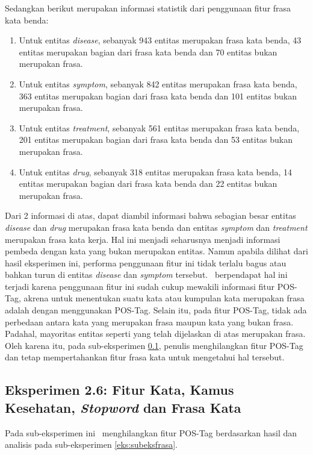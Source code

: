	Sedangkan berikut merupakan informasi statistik dari penggunaan fitur frasa kata benda:
	\begin{enumerate}
		\item Untuk entitas \textit{disease}, sebanyak 943 entitas merupakan frasa kata benda, 43 entitas merupakan bagian dari frasa kata benda dan 70 entitas bukan merupakan frasa.
		\item Untuk entitas \textit{symptom}, sebanyak 842 entitas merupakan frasa kata benda, 363 entitas merupakan bagian dari frasa kata benda dan 101 entitas bukan merupakan frasa.
		\item Untuk entitas \textit{treatment}, sebanyak 561 entitas merupakan frasa kata benda, 201 entitas merupakan bagian dari frasa kata benda dan 53 entitas bukan merupakan frasa.
		\item Untuk entitas \textit{drug}, sebanyak 318 entitas merupakan frasa kata benda, 14 entitas merupakan bagian dari frasa kata benda dan 22  entitas bukan merupakan frasa.
	\end{enumerate}
	
	Dari 2 informasi di atas, dapat diambil informasi bahwa sebagian besar entitas \textit{disease} dan \textit{drug} merupakan frasa kata benda dan entitas \textit{symptom} dan \textit{treatment} merupakan frasa kata kerja. Hal ini menjadi seharusnya menjadi informasi pembeda dengan kata yang bukan merupakan entitas. Namun apabila dilihat dari hasil eksperimen ini, performa penggunaan fitur ini tidak terlalu bagus atau bahkan turun di entitas \textit{disease} dan \textit{symptom} tersebut. \Saya~berpendapat hal ini terjadi karena penggunaan fitur ini sudah cukup mewakili informasi fitur POS-Tag, akrena untuk menentukan suatu kata atau kumpulan kata merupakan frasa adalah dengan menggunakan POS-Tag. Selain itu, pada fitur POS-Tag, tidak ada perbedaan antara kata yang merupakan frasa maupun kata yang bukan frasa. Padahal, mayoritas entitas seperti yang telah dijelaskan di atas merupakan frasa. Oleh karena itu, pada sub-eksperimen \ref{eks:subeksminpostag}, penulis menghilangkan fitur POS-Tag dan tetap mempertahankan fitur frasa kata untuk mengetahui hal tersebut. 
	
	\subsection{Eksperimen 2.6: Fitur Kata, Kamus Kesehatan, \textit{Stopword} dan Frasa Kata}\label{eks:subeksminpostag}
	Pada sub-eksperimen ini \saya~menghilangkan fitur POS-Tag berdasarkan hasil dan analisis pada sub-eksperimen \ref{eks:subeksfrasa}.
	
